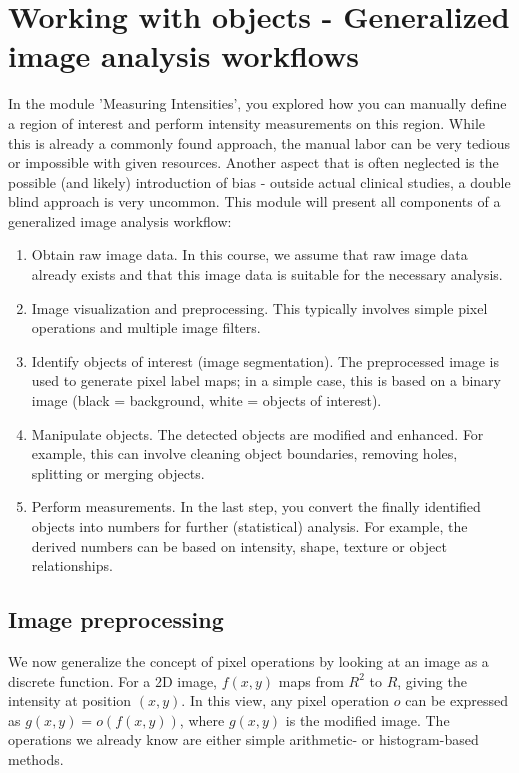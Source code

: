 \chapter{Working with objects - Generalized image analysis workflows}

In the module 'Measuring Intensities', you explored how you can manually define a region of interest and perform intensity measurements on this region. While this is already a commonly found approach, the manual labor can be very tedious or impossible with given resources. Another aspect that is often neglected is the possible (and likely) introduction of bias - outside actual clinical studies, a double blind approach is very uncommon. This module will present all components of a generalized image analysis workflow:

\begin{enumerate}
	\item Obtain raw image data. In this course, we assume that raw image data already exists and that this image data is suitable for the necessary analysis.
	\item Image visualization and preprocessing. This typically involves simple pixel operations and multiple image filters.
	\item Identify objects of interest (image segmentation). The preprocessed image is used to generate pixel label maps; in a simple case, this is based on a binary image (black = background, white = objects of interest).
	\item Manipulate objects. The detected objects are modified and enhanced. For example, this can involve cleaning object boundaries, removing holes, splitting or merging objects.
	\item Perform measurements. In the last step, you convert the finally identified objects into numbers for further (statistical) analysis. For example, the derived numbers can be based on intensity, shape, texture or object relationships.
\end{enumerate}

\section{Image preprocessing}

We now generalize the concept of pixel operations by looking at an image as a discrete function. For a 2D image, $f(x,y)$ maps from $R^2$ to $R$, giving the intensity at position $(x,y)$. In this view, any pixel operation $o$ can be expressed as $g\left(x,y\right)=o\left(f\left(x,y\right)\right)$, where $g(x,y)$ is the modified image. The operations we already know are either simple arithmetic- or histogram-based methods. 

